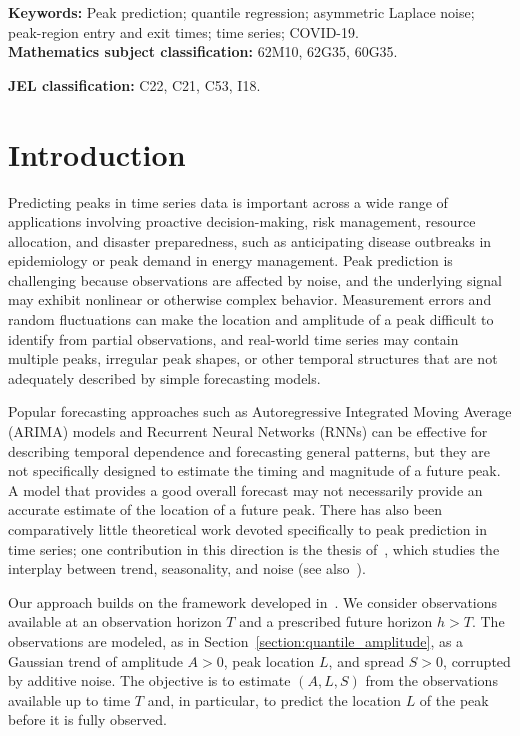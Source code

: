 \documentclass[12pt,a4paper]{article}
\begin{document}
\noindent
\textbf{Keywords:} Peak prediction; quantile regression; asymmetric Laplace noise; peak-region entry and exit times; time series; COVID-19.\\

\noindent
\textbf{Mathematics subject classification:} 62M10, 62G35, 60G35.


\noindent
\textbf{JEL classification:} C22, C21, C53, I18.

\clearpage

\section{Introduction}
\label{section:1}

Predicting peaks in time series data is important across a wide range of
applications involving proactive decision-making, risk management,
resource allocation, and disaster preparedness, such as anticipating
disease outbreaks in epidemiology or peak demand in energy management.
Peak prediction is challenging because observations are affected by
noise, and the underlying signal may exhibit nonlinear or otherwise
complex behavior. Measurement errors and random fluctuations can make
the location and amplitude of a peak difficult to identify from partial
observations, and real-world time series may contain multiple peaks,
irregular peak shapes, or other temporal structures that are not
adequately described by simple forecasting models.

Popular forecasting approaches such as Autoregressive Integrated Moving
Average (ARIMA) models and Recurrent Neural Networks (RNNs) can be
effective for describing temporal dependence and forecasting general
patterns, but they are not specifically designed to estimate the timing
and magnitude of a future peak. A model that provides a good overall
forecast may not necessarily provide an accurate estimate of the
location of a future peak. There has also been comparatively little
theoretical work devoted specifically to peak prediction in time series;
one contribution in this direction is the thesis of~\citet{Tuc20},
which studies the interplay between trend, seasonality, and noise (see
also~\citet{YuB2019,See17}).

Our approach builds on the framework developed in~\citet{Der25}. We
consider observations available at an observation horizon $T$ and a
prescribed future horizon $h>T$. The observations are modeled, as in
Section~\ref{section:quantile_amplitude}, as a Gaussian trend of
amplitude $A>0$, peak location $L$, and spread $S>0$, corrupted by
additive noise. The objective is to estimate $(A,L,S)$ from the
observations available up to time $T$ and, in particular, to predict the
location $L$ of the peak before it is fully observed.
\end{document}
